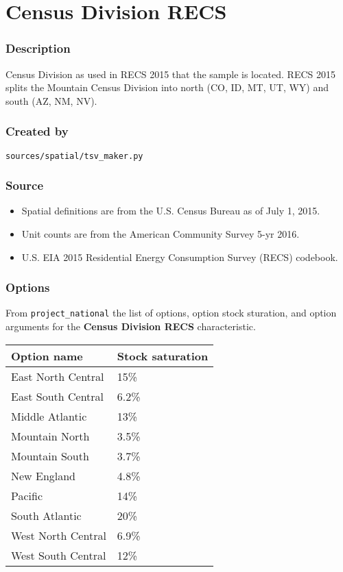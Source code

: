 \section{Census Division RECS}\label{census_division_recs}

\subsubsection{Description}\label{description-12}

Census Division as used in RECS 2015 that the sample is located. RECS
2015 splits the Mountain Census Division into north (CO, ID, MT, UT, WY)
and south (AZ, NM, NV).

\subsubsection{Created by}\label{created-by-12}

\texttt{sources/spatial/tsv\_maker.py}

\subsubsection{Source}\label{source-12}

\begin{itemize}
 
\item
  Spatial definitions are from the U.S. Census Bureau as of July 1,
  2015.
\item
  Unit counts are from the American Community Survey 5-yr 2016.
\item
  U.S. EIA 2015 Residential Energy Consumption Survey (RECS) codebook.
\end{itemize}

\subsubsection{Options}\label{options-12}

From \texttt{project\_national} the list of options, option stock
sturation, and option arguments for the \textbf{Census Division RECS}
characteristic.

\begin{longtable}[]{@{}ll@{}}
\toprule\noalign{}
Option name & Stock saturation \\
\midrule\noalign{}
\endhead
\bottomrule\noalign{}
\endlastfoot
East North Central & 15\% \\
East South Central & 6.2\% \\
Middle Atlantic & 13\% \\
Mountain North & 3.5\% \\
Mountain South & 3.7\% \\
New England & 4.8\% \\
Pacific & 14\% \\
South Atlantic & 20\% \\
West North Central & 6.9\% \\
West South Central & 12\% \\
\end{longtable}

